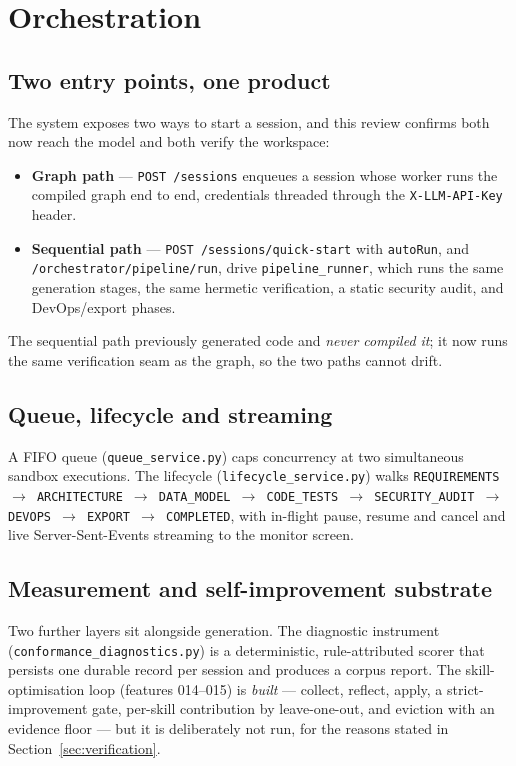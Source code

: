 \documentclass[11pt,a4paper]{article}
\begin{document}
\section{Orchestration}

\subsection{Two entry points, one product}

The system exposes two ways to start a session, and this review confirms both now
reach the model and both verify the workspace:

\begin{itemize}[leftmargin=1.4em]
  \item \textbf{Graph path} --- \texttt{POST /sessions} enqueues a session whose
  worker runs the compiled graph end to end, credentials threaded through the
  \texttt{X-LLM-API-Key} header.
  \item \textbf{Sequential path} --- \texttt{POST /sessions/quick-start} with
  \texttt{autoRun}, and \texttt{/orchestrator/pipeline/run}, drive
  \texttt{pipeline\_runner}, which runs the same generation stages, the same
  hermetic verification, a static security audit, and DevOps/export phases.
\end{itemize}

The sequential path previously generated code and \emph{never compiled it}; it now
runs the same verification seam as the graph, so the two paths cannot drift.

\subsection{Queue, lifecycle and streaming}

A FIFO queue (\texttt{queue\_service.py}) caps concurrency at two simultaneous
sandbox executions. The lifecycle (\texttt{lifecycle\_service.py}) walks
\texttt{REQUIREMENTS $\rightarrow$ ARCHITECTURE $\rightarrow$ DATA\_MODEL
$\rightarrow$ CODE\_TESTS $\rightarrow$ SECURITY\_AUDIT $\rightarrow$ DEVOPS
$\rightarrow$ EXPORT $\rightarrow$ COMPLETED}, with in-flight pause, resume and cancel
and live Server-Sent-Events streaming to the monitor screen.

\subsection{Measurement and self-improvement substrate}

Two further layers sit alongside generation. The diagnostic instrument
(\texttt{conformance\_diagnostics.py}) is a deterministic, rule-attributed scorer
that persists one durable record per session and produces a corpus report. The
skill-optimisation loop (features 014--015) is \emph{built} --- collect, reflect,
apply, a strict-improvement gate, per-skill contribution by leave-one-out, and
eviction with an evidence floor --- but it is deliberately not run, for the reasons
stated in Section~\ref{sec:verification}.
\end{document}
